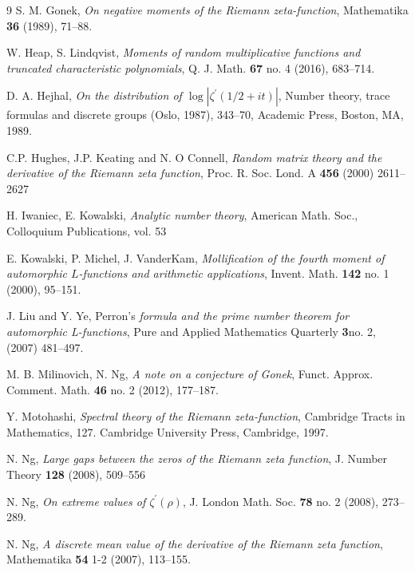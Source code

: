 \documentclass[oneside, 12pt]{amsart}
\theoremstyle{definition}
\begin{document}
\begin{thebibliography}{9}
 S. M. Gonek, \emph{On negative moments of the Riemann zeta-function}, Mathematika {\bf 36} (1989), 71--88.


W. Heap, S. Lindqvist, \emph{Moments of random multiplicative functions and truncated
characteristic polynomials}, Q. J. Math. {\bf 67} no. 4 (2016), 683--714.


 D. A. Hejhal, \emph{On the distribution of $\log |\zeta^\prime(1/2+it)|$}, Number theory, trace formulas and
discrete groups (Oslo, 1987), 343--70, Academic Press, Boston, MA, 1989.



 C.P. Hughes, J.P. Keating and N. O Connell, \emph{Random matrix theory and the derivative of
the Riemann zeta function}, Proc. R. Soc. Lond. A {\bf 456} (2000) 2611--2627



H. Iwaniec, E. Kowalski, \emph{Analytic number theory}, American Math. Soc., Colloquium Publications, vol. 53



E. Kowalski, P. Michel, J. VanderKam, \emph{Mollification of the fourth moment of automorphic $L$-functions and arithmetic applications}, Invent. Math. {\bf 142} no. 1 (2000), 95--151.



J. Liu and Y. Ye, Perron’s \emph{formula and the prime number theorem for automorphic L-functions}, Pure and Applied Mathematics Quarterly {\bf 3}no. 2, (2007) 481--497.



M. B. Milinovich, N. Ng, \emph{A note on a conjecture of Gonek}, Funct. Approx. Comment. Math.
{\bf 46}  no. 2 (2012), 177--187.



Y. Motohashi, \emph{Spectral theory of the Riemann zeta-function}, Cambridge Tracts in Mathematics, 127. Cambridge University Press, Cambridge, 1997.



N. Ng, \emph{Large gaps between the zeros of the Riemann zeta function}, J. Number Theory {\bf 128} (2008), 509--556 



N. Ng,  \emph{On extreme values of $\zeta^\prime(\rho)$}, J. London Math. Soc. {\bf 78} no. 2 (2008), 273--289.



 N. Ng, \emph{ A discrete mean value of the derivative of the Riemann zeta function}, Mathematika {\bf 54} 1-2 (2007), 113--155.



\end{thebibliography}
\end{document}
